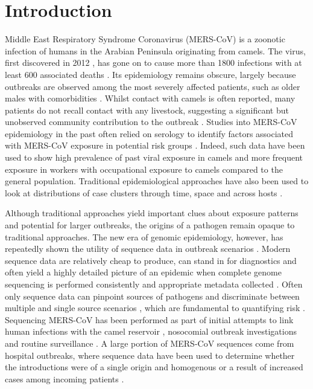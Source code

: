 \documentclass[11pt,oneside,letterpaper]{article}
\begin{document}
\section*{Introduction}
Middle East Respiratory Syndrome Coronavirus (MERS-CoV) is a zoonotic infection of humans in the Arabian Peninsula originating from camels.
The virus, first discovered in 2012 \citep{zaki_isolation_2012,boheemen_genomic_2012}, has gone on to cause more than 1800 infections with at least 600 associated deaths \citep{who_2016_MERS}.
Its epidemiology remains obscure, largely because outbreaks are observed among the most severely affected patients, such as older males with comorbidities \citep{assiri_2013,group_state_2013}.
Whilst contact with camels is often reported, many patients do not recall contact with any livestock, suggesting a significant but unobserved community contribution to the outbreak \citep{group_state_2013}.
Studies into MERS-CoV epidemiology in the past often relied on serology to identify factors associated with MERS-CoV exposure in potential risk groups \citep{reusken_occupational_2015,reusken_2013}.
Indeed, such data have been used to show high prevalence of past viral exposure in camels \citep{muller_2014,corman_antibodies_2014,chu_2014,reusken_2013,reusken_2014} and more frequent exposure in workers with occupational exposure to camels \citep{reusken_occupational_2015,muller_presence_2015} compared to the general population.
Traditional epidemiological approaches have also been used to look at distributions of case clusters through time, space and across hosts \citep{cauchemez_unraveling_2016}.


Although traditional approaches yield important clues about exposure patterns and potential for larger outbreaks, the origins of a pathogen remain opaque to traditional approaches.
The new era of genomic epidemiology, however, has repeatedly shown the utility of sequence data in outbreak scenarios \citep{arias_rapid_2016}.
Modern sequence data are relatively cheap to produce, can stand in for diagnostics and often yield a highly detailed picture of an epidemic when complete genome sequencing is performed consistently and appropriate metadata collected \citep{dudas_virus_2016}.
Often only sequence data can pinpoint sources of pathogens and discriminate between multiple and single source scenarios \citep{gire_genomic_2014}, which are fundamental to quantifying risk \citep{grubaugh_multiple_2017}.
Sequencing MERS-CoV has been performed as part of initial attempts to link human infections with the camel reservoir \citep{memish_human_2014}, nosocomial outbreak investigations \citep{assiri_hospital_2013} and routine surveillance \citep{park_acute_2015}.
A large portion of MERS-CoV sequences come from hospital outbreaks, where sequence data have been used to determine whether the introductions were of a single origin and homogenous or a result of increased cases among incoming patients \citep{fagbo_molecular_2015}.
\end{document}
